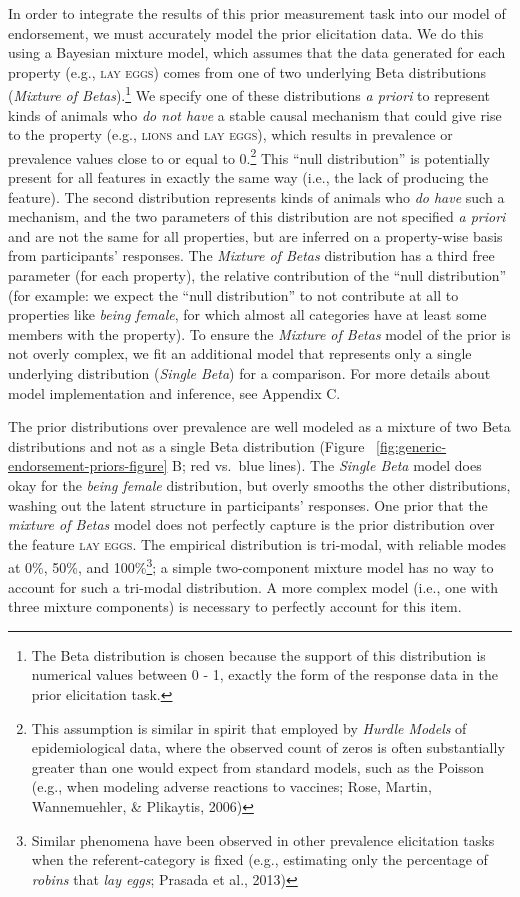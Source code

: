 \documentclass[english,floatsintext,man]{apa6}
\theoremstyle{definition}
\theoremstyle{definition}
\theoremstyle{definition}
\theoremstyle{remark}
\begin{document}
In order to integrate the results of this prior measurement task into
our model of endorsement, we must accurately model the prior elicitation
data. We do this using a Bayesian mixture model, which assumes that the
data generated for each property (e.g., \textsc{lay eggs}) comes from
one of two underlying Beta distributions (\emph{Mixture of
Betas}).\footnote{The Beta distribution is chosen because the support of
  this distribution is numerical values between 0 - 1, exactly the form
  of the response data in the prior elicitation task.} We specify one of
these distributions \emph{a priori} to represent kinds of animals who
\emph{do not have} a stable causal mechanism that could give rise to the
property (e.g., \textsc{lions} and \textsc{lay eggs}), which results in
prevalence or prevalence values close to or equal to 0.\footnote{This
  assumption is similar in spirit that employed by \emph{Hurdle Models}
  of epidemiological data, where the observed count of zeros is often
  substantially greater than one would expect from standard models, such
  as the Poisson (e.g., when modeling adverse reactions to vaccines;
  Rose, Martin, Wannemuehler, \& Plikaytis, 2006)} This \enquote{null
distribution} is potentially present for all features in exactly the
same way (i.e., the lack of producing the feature). The second
distribution represents kinds of animals who \emph{do have} such a
mechanism, and the two parameters of this distribution are not specified
\emph{a priori} and are not the same for all properties, but are
inferred on a property-wise basis from participants' responses. The
\emph{Mixture of Betas} distribution has a third free parameter (for
each property), the relative contribution of the \enquote{null
distribution} (for example: we expect the \enquote{null distribution} to
not contribute at all to properties like \emph{being female}, for which
almost all categories have at least some members with the property). To
ensure the \emph{Mixture of Betas} model of the prior is not overly
complex, we fit an additional model that represents only a single
underlying distribution (\emph{Single Beta}) for a comparison. For more
details about model implementation and inference, see Appendix C.

The prior distributions over prevalence are well modeled as a mixture of
two Beta distributions and not as a single Beta distribution (Figure~
\ref{fig:generic-endorsement-priors-figure} B; red vs.~blue lines). The
\emph{Single Beta} model does okay for the \emph{being female}
distribution, but overly smooths the other distributions, washing out
the latent structure in participants' responses. One prior that the
\emph{mixture of Betas} model does not perfectly capture is the prior
distribution over the feature \textsc{lay eggs}. The empirical
distribution is tri-modal, with reliable modes at 0\%, 50\%, and
100\%\footnote{Similar phenomena have been observed in other prevalence
  elicitation tasks when the referent-category is fixed (e.g.,
  estimating only the percentage of \emph{robins} that \emph{lay eggs};
  Prasada et al., 2013)}; a simple two-component mixture model has no
way to account for such a tri-modal distribution. A more complex model
(i.e., one with three mixture components) is necessary to perfectly
account for this item.
\end{document}
